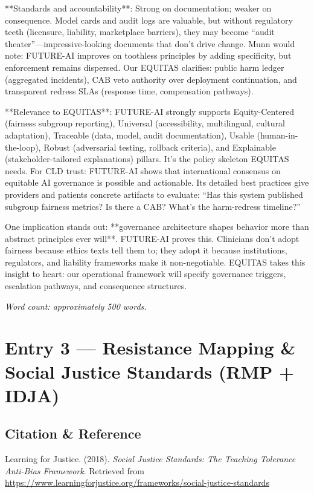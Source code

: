 \documentclass[12pt,twoside]{article}
\begin{document}
**Standards and accountability**: Strong on documentation; weaker on consequence. Model cards and audit logs are valuable, but without regulatory teeth (licensure, liability, marketplace barriers), they may become ``audit theater''—impressive-looking documents that don't drive change. Munn would note: FUTURE-AI improves on toothless principles by adding specificity, but enforcement remains dispersed. Our EQUITAS clarifies: public harm ledger (aggregated incidents), CAB veto authority over deployment continuation, and transparent redress SLAs (response time, compensation pathways).

**Relevance to EQUITAS**: FUTURE-AI strongly supports Equity-Centered (fairness subgroup reporting), Universal (accessibility, multilingual, cultural adaptation), Traceable (data, model, audit documentation), Usable (human-in-the-loop), Robust (adversarial testing, rollback criteria), and Explainable (stakeholder-tailored explanations) pillars. It's the policy skeleton EQUITAS needs. For CLD trust: FUTURE-AI shows that international consensus on equitable AI governance is possible and actionable. Its detailed best practices give providers and patients concrete artifacts to evaluate: ``Has this system published subgroup fairness metrics? Is there a CAB? What's the harm-redress timeline?''

One implication stands out: **governance architecture shapes behavior more than abstract principles ever will**. FUTURE-AI proves this. Clinicians don't adopt fairness because ethics texts tell them to; they adopt it because institutions, regulators, and liability frameworks make it non-negotiable. EQUITAS takes this insight to heart: our operational framework will specify governance triggers, escalation pathways, and consequence structures.

\emph{Word count: approximately 500 words.}

\newpage

\section*{Entry 3 --- Resistance Mapping \& Social Justice Standards (RMP + IDJA)}

\subsection*{Citation \& Reference}

Learning for Justice. (2018). \textit{Social Justice Standards: The Teaching Tolerance Anti-Bias Framework}. Retrieved from \href{https://www.learningforjustice.org/frameworks/social-justice-standards}{https://www.learningforjustice.org/frameworks/social-justice-standards}
\end{document}
